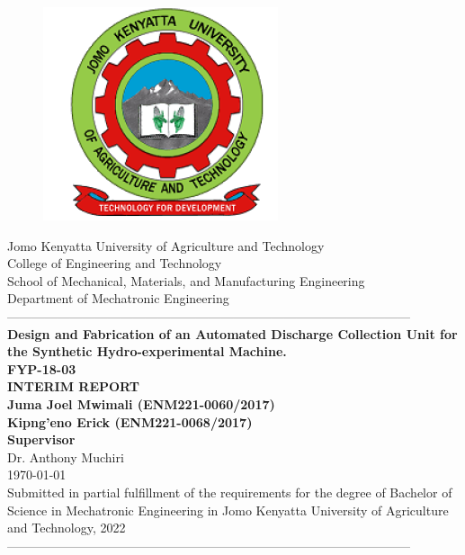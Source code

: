\documentclass[12pt,fleqn]{article}
\begin{document}
\begin{titlepage}
  \begin{center}
      \vspace*{-4.0cm}
    \begin{figure}[!h]
\centering
\includegraphics[width=0.3\linewidth]{Figures/JKUAT_logo}
\label{fig:jomologo}
\end{figure}
   \large{Jomo Kenyatta University of Agriculture and Technology}\\
    \large{College of Engineering and Technology}\\
    \large{School of Mechanical, Materials, and Manufacturing Engineering}\\
   \large{Department of Mechatronic Engineering}\\
    ------------------------------------------------------------------------------------------------\\[0.1cm]
    \LARGE{\textbf{Design and Fabrication of an Automated Discharge Collection Unit for the Synthetic Hydro-experimental Machine.}}\\[0.1cm]
    \LARGE{\textbf{FYP-18-03}}\\[0.4cm]
    \LARGE{\textbf{INTERIM REPORT}}\\[0.4cm]
    \large{\textbf{Juma Joel Mwimali (ENM221-0060/2017)}}\\
     \large{\textbf{Kipng'eno Erick (ENM221-0068/2017)}}\\[0.2cm]
     \large{\textbf{Supervisor}}\\
	\large{Dr. Anthony Muchiri}\\
    \large{\small{\monthyeardate\today}}\\
    \small{Submitted in partial fulfillment of the requirements for the degree of Bachelor of Science in Mechatronic Engineering in Jomo Kenyatta University of Agriculture and Technology, 2022}\\
    ------------------------------------------------------------------------------------------------\\[1.5cm]
  \end{center}
\end{titlepage}
\end{document}
